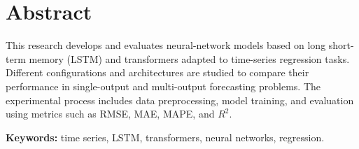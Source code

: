 \chapter*{Abstract}

This research develops and evaluates neural-network models based on long short-term memory (LSTM) and transformers adapted to time-series regression tasks. Different configurations and architectures are studied to compare their performance in single-output and multi-output forecasting problems. The experimental process includes data preprocessing, model training, and evaluation using metrics such as RMSE, MAE, MAPE, and $R^2$.

\vspace{0.5cm}
\noindent\textbf{Keywords:} time series, LSTM, transformers, neural networks, regression.
